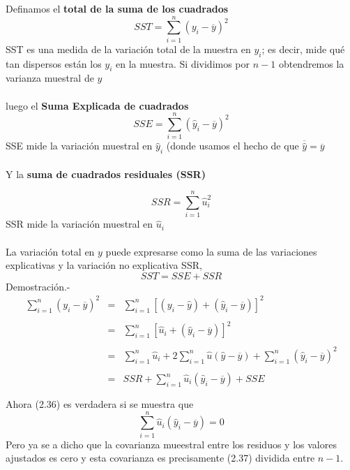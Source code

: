Definamos el \textbf{total de la suma de los cuadrados}\\

\begin{equation}
    SST = \sum\limits_{i=1}^n (y_i - \overline{y})^2
\end{equation}
SST es una medida de la variación total de la muestra en $y_i$; es decir, mide qué tan dispersos están los $y_i$ en la muestra. Si dividimos por $n-1$ obtendremos la varianza muestral de $y$\\\\

luego el \textbf{Suma Explicada de cuadrados}\\

\begin{equation}
    SSE = \sum\limits_{i=1}^n (\hat{y}_i - \overline{y})^2
\end{equation}
SSE mide la variación muestral en $\hat{y}_i$ (donde usamos el hecho de que $\overline{\hat{y}} = \overline{y}$\\\\ 
Y la \textbf{suma de cuadrados residuales (SSR)}

\begin{equation}
    SSR = \sum\limits_{i=1}^n \hat{u}_i^2 
\end{equation}
SSR mide la variación muestral en $\hat{u}_i$\\\\

La variación total en $y$ puede expresarse como la suma de las variaciones explicativas y la variación no explicativa SSR, 
\begin{equation}
	SST = SSE + SSR
\end{equation}
Demostración.-\; 
$$\begin{array}{rcl}
    \sum\limits_{i=1}^n (y_i - \overline{y})^2&=&\sum\limits_{i=1}^n\left[(y_i - \hat{y})+(\hat{y}_i - \overline{y})\right]^2\\\\
					      &=&\sum\limits_{i=1}^n \left[\hat{u}_i + (\hat{y}_i - \overline{y})\right]^2 \\\\
					      &=&\sum\limits_{i=1}^n \hat{u}_i + 2\sum\limits_{i=1}^n\hat{u}(\hat{y}-\overline{y}) + \sum\limits_{i=1}^n (\hat{y}_i - \overline{y})^2\\\\
					      &=&SSR + \sum\limits_{i=1}^n \hat{u}_i (\hat{y}_i - \overline{y}) + SSE\\\\
\end{array}$$
Ahora (2.36) es verdadera si se muestra que 
$$\sum_{i=1}^n \hat{u}_i (\hat{y}_i - \overline{y}) = 0$$
Pero ya se a dicho que la covarianza mueestral entre los residuos y los valores ajustados es cero y esta covarianza es precisamente (2.37) dividida entre $n-1$.\\\\

